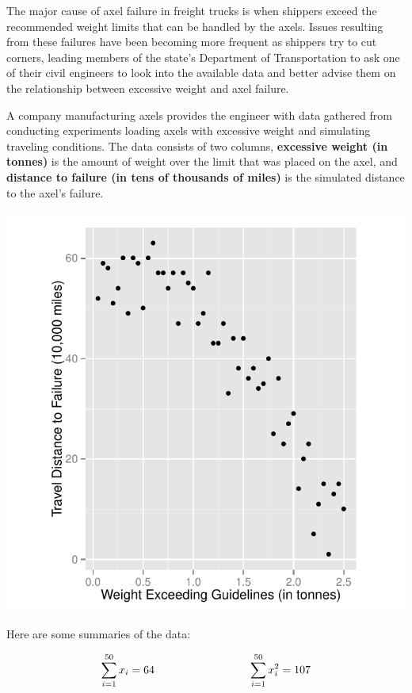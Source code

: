 \documentclass{examsetup}\usepackage[]{graphicx}\usepackage[]{color}
\newenvironment{knitrout}{}{} %
\begin{document}
\begin{questions}
\begin{parts}
\begin{solution}
\end{solution}

\end{parts}
\pagebreak

\question

The major cause of axel failure in freight trucks is when shippers exceed the recommended weight limits that can be handled by the axels. 
Issues resulting from these failures have been becoming more frequent as shippers try to cut corners, 
leading members of the state's Department of Transportation to ask one of their civil engineers 
to look into the available data and better advise them on the relationship between excessive weight and axel failure.

A company manufacturing axels provides the engineer with data gathered from conducting experiments loading axels with excessive weight and simulating traveling conditions.
The data consists of two columns, \textbf{excessive weight (in tonnes)} is the amount of weight over the limit that was placed on the axel, and 
\textbf{distance to failure (in tens of thousands of miles)} is the simulated distance to the axel's failure. 



\begin{center}
\begin{knitrout}
\color{fgcolor}
\includegraphics[width=.5\linewidth]{figure/unnamed-chunk-12-1} 

\end{knitrout}
\end{center}

Here are some summaries of the data:

$$
\sum_{i=1}^{50} x_i = 64 \hspace{3cm} \sum_{i=1}^{50} x_i^2 = 107 \\
$$


\end{questions}
\end{document}
